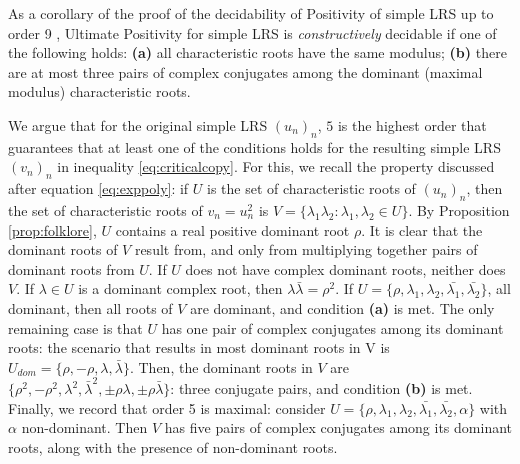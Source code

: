 As a corollary of the proof of the decidability of Positivity of simple LRS up to order 9 \cite{ouaknine2014positivity}, Ultimate Positivity for simple LRS is \textit{constructively} decidable if one of the following holds: \textbf{(a)} all characteristic roots have the same modulus; {\bf(b)} there are at most three pairs of complex conjugates among the dominant (maximal modulus) characteristic roots. 

We argue that for the original simple LRS $(u_n)_n$, $5$ is the highest order that guarantees that at least one of the conditions holds for the resulting simple LRS $(v_n)_n$ in inequality \ref{eq:criticalcopy}. For this, we recall the property discussed after equation \ref{eq:exppoly}: if $U$ is the set of characteristic roots of $(u_n)_n$, then the set of characteristic roots of $v_n = u_n^2$ is $V = \{\lambda_1\lambda_2: \lambda_1, \lambda_2 \in U\}$. By Proposition \ref{prop:folklore}, $U$ contains a real positive dominant root $\rho$. It is clear that the dominant roots of $V$ result from, and only from multiplying together pairs of dominant roots from $U$. If $U$ does not have complex dominant roots, neither does $V$. If $\lambda \in U$ is a dominant complex root, then $\lambda\bar\lambda = \rho^2$. If $U = \{\rho, \lambda_1, \lambda_2, \bar{\lambda_1}, \bar{\lambda_2}\}$, all dominant, then all roots of $V$ are dominant, and condition \textbf{(a)} is met. The only remaining case is that $U$ has one pair of complex conjugates among its dominant roots: the scenario that results in most dominant roots in V is $U_{dom} = \{\rho, -\rho, \lambda, \bar{\lambda}\}$. Then, the dominant roots in $V$ are $\{\rho^2, -\rho^2, \lambda^2, \bar\lambda^2, \pm \rho\lambda, \pm \rho\bar\lambda\}$: three conjugate pairs, and condition \textbf{(b)} is met. Finally, we record that order 5 is maximal: consider $U = \{\rho, \lambda_1, \lambda_2, \bar{\lambda_1}, \bar{\lambda_2}, \alpha\}$ with $\alpha$ non-dominant. Then $V$ has five pairs of complex conjugates among its dominant roots, along with the presence of non-dominant roots.


